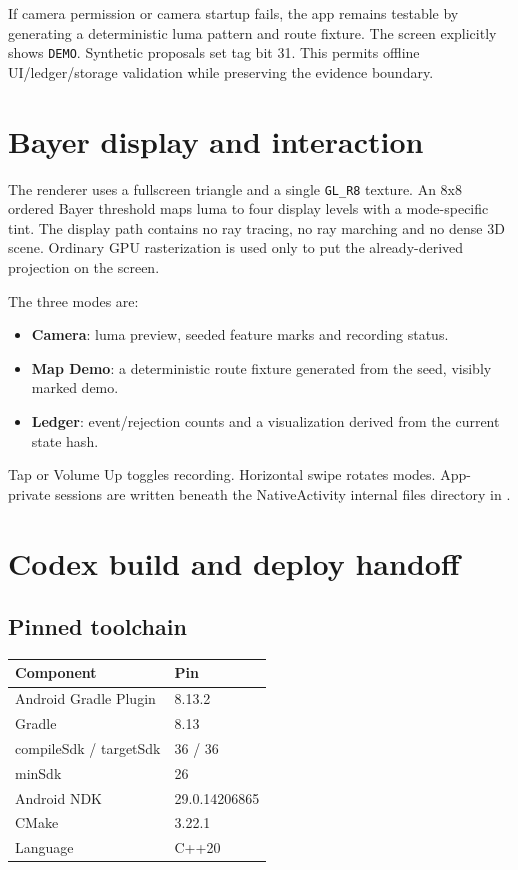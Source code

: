 \documentclass[10.5pt,a4paper]{article}
\newcommand{\filepath}[1]{\texttt{\detokenize{#1}}}
\begin{document}
If camera permission or camera startup fails, the app remains testable by generating a deterministic luma pattern and route fixture. The screen explicitly shows \texttt{DEMO}. Synthetic proposals set tag bit 31. This permits offline UI/ledger/storage validation while preserving the evidence boundary.

\section{Bayer display and interaction}

The renderer uses a fullscreen triangle and a single \texttt{GL\_R8} texture. An 8x8 ordered Bayer threshold maps luma to four display levels with a mode-specific tint. The display path contains no ray tracing, no ray marching and no dense 3D scene. Ordinary GPU rasterization is used only to put the already-derived projection on the screen.

The three modes are:

\begin{itemize}
\item \textbf{Camera}: luma preview, seeded feature marks and recording status.
\item \textbf{Map Demo}: a deterministic route fixture generated from the seed, visibly marked demo.
\item \textbf{Ledger}: event/rejection counts and a visualization derived from the current state hash.
\end{itemize}

Tap or Volume Up toggles recording. Horizontal swipe rotates modes. App-private sessions are written beneath the NativeActivity internal files directory in \filepath{sessions/}.

\section{Codex build and deploy handoff}

\subsection{Pinned toolchain}

\begin{table}[H]
\centering
\begin{tabular}{ll}
\toprule
Component & Pin\\
\midrule
Android Gradle Plugin & 8.13.2\\
Gradle & 8.13\\
compileSdk / targetSdk & 36 / 36\\
minSdk & 26\\
Android NDK & 29.0.14206865\\
CMake & 3.22.1\\
Language & C++20\\
\bottomrule
\end{tabular}
\end{table}
\end{document}
